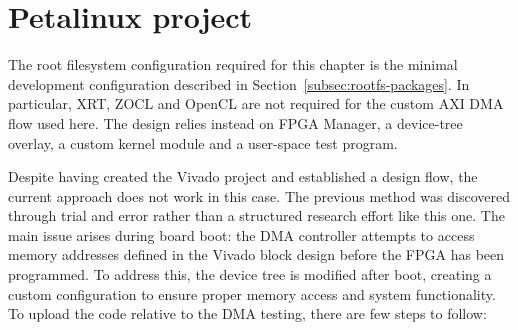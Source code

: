 \section{Petalinux project}
The root filesystem configuration required for this chapter is the minimal development configuration described in Section~\ref{subsec:rootfs-packages}. In particular, XRT, ZOCL and OpenCL are not required for the custom AXI DMA flow used here. The design relies instead on FPGA Manager, a device-tree overlay, a custom kernel module and a user-space test program.

Despite having created the Vivado project and established a design flow, the current approach does not work in this case. The previous method was discovered through trial and error rather than a structured research effort like this one. The main issue arises during board boot: the DMA controller attempts to access memory addresses defined in the Vivado block design before the FPGA has been programmed. To address this, the device tree is modified after boot, creating a custom configuration to ensure proper memory access and system functionality. To upload the code relative to the DMA testing, there are few steps to follow:
